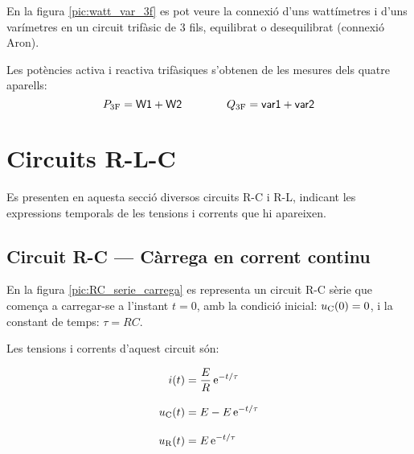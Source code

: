En la figura \vref{pic:watt_var_3f} es pot veure la connexió d'uns
wattímetres i d'uns varímetres en un circuit trifàsic de 3 fils,
equilibrat o desequilibrat (connexió Aron).

\begin{center}
\centering
    
    \label{pic:watt_var_3f}
\end{center}

Les potències activa i reactiva trifàsiques s'obtenen de les mesures
dels quatre aparells:
\begin{equation}
    P_\mathrm{3F} = \textsf{W1} +  \textsf{W2}
    \qquad\qquad Q_\mathrm{3F} = \textsf{var1} +  \textsf{var2}
\end{equation}



\section{Circuits R-L-C}

Es presenten en aquesta secció diversos circuits R-C i R-L, indicant les expressions temporals de les tensions i corrents que hi apareixen.

\subsection{Circuit R-C --- Càrrega en corrent continu}\label{sec:RC-carrega}

En la figura \vref{pic:RC_serie_carrega} es representa un circuit R-C sèrie que comença a carregar-se a l'instant $t=0$, amb la condició inicial: $u_\mathrm{C}(0) = 0$, i la constant de temps: $\tau = R C$.
\begin{center}
    
    \label{pic:RC_serie_carrega}
\end{center}

Les tensions i corrents d'aquest circuit són:

\hfill
\begin{minipage}[b]{9cm}
    
\end{minipage}
\hfill
\begin{minipage}[b]{6cm}
    \begin{align}
        i(t) &= \frac{E}{R}\,\mathrm{e}^{-t/\tau}\label{eq:RC-carrega} \\[3mm]
        u_\mathrm{C}(t) &= E  - E\, \mathrm{e}^{-t/\tau}  \\[3mm]
        u_\mathrm{R}(t) &= E\,\mathrm{e}^{-t/\tau}
    \end{align}
\end{minipage}

